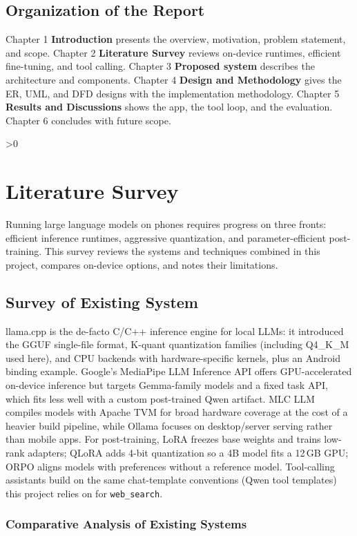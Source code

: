 \documentclass[12pt,a4paper]{report}
\let\oldchapter\chapter
\renewcommand{\chapter}{\ifnum\value{chapter}>0 \clearpage\pagestyle{fancy}\fi\oldchapter}
\begin{document}
\section{Organization of the Report}

    Chapter 1 \textbf{Introduction} presents the overview, motivation,
    problem statement, and scope. Chapter 2 \textbf{Literature Survey}
    reviews on-device runtimes, efficient fine-tuning, and tool
    calling. Chapter 3 \textbf{Proposed system} describes the
    architecture and components. Chapter 4 \textbf{Design and
    Methodology} gives the ER, UML, and DFD designs with the
    implementation methodology. Chapter 5 \textbf{Results and
    Discussions} shows the app, the tool loop, and the evaluation.
    Chapter 6 concludes with future scope.


\chapter{Literature Survey}
Running large language models on phones requires progress on three
fronts: efficient inference runtimes, aggressive quantization, and
parameter-efficient post-training. This survey reviews the systems and
techniques combined in this project, compares on-device options, and
notes their limitations.
\section{Survey of Existing System}
llama.cpp \cite{R1} is the de-facto C/C++ inference engine for local
LLMs: it introduced the GGUF single-file format, K-quant quantization
families (including Q4\_K\_M used here), and CPU backends with
hardware-specific kernels, plus an Android binding example. Google's
MediaPipe LLM Inference API \cite{R2} offers GPU-accelerated on-device
inference but targets Gemma-family models and a fixed task API, which
fits less well with a custom post-trained Qwen artifact. MLC LLM
\cite{R3} compiles models with Apache TVM for broad hardware coverage
at the cost of a heavier build pipeline, while Ollama \cite{R4} focuses
on desktop/server serving rather than mobile apps. For post-training,
LoRA \cite{R5} freezes base weights and trains low-rank adapters;
QLoRA \cite{R6} adds 4-bit quantization so a 4B model fits a 12\,GB
GPU; ORPO \cite{R7} aligns models with preferences without a reference
model. Tool-calling assistants build on the same chat-template
conventions (Qwen tool templates) this project relies on for
\texttt{web\_search}.
\subsection{Comparative Analysis of Existing Systems}
\small %
\end{document}
